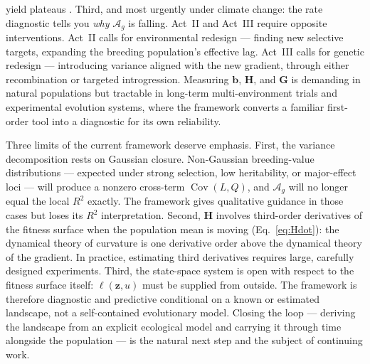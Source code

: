 \documentclass[9pt,twocolumn,twoside]{pnas-new}
\newcommand{\vect}[1]{\boldsymbol{#1}}
\newcommand{\mat}[1]{\mathbf{#1}}
\newcommand{\Ag}{\mathcal{A}_{g}}
\newcommand{\Cov}{\operatorname{Cov}}
\begin{document}
yield plateaus \cite{Technow2021}.
Third, and most urgently under climate change: the rate diagnostic
tells you \emph{why} $\Ag$ is falling.
Act~II and Act~III require opposite interventions.
Act~II calls for environmental redesign --- finding new selective
targets, expanding the breeding population's effective lag.
Act~III calls for genetic redesign --- introducing variance
aligned with the new gradient, through either recombination or
targeted introgression.
Measuring $\vect{b}$, $\mat{H}$, and $\mat{G}$ is demanding in
natural populations \cite{Kingsolver2001,KingsolverPfennig2007}
but tractable in long-term multi-environment trials and experimental
evolution systems, where the framework converts a familiar
first-order tool into a diagnostic for its own reliability.

Three limits of the current framework deserve emphasis.
First, the variance decomposition rests on Gaussian closure.
Non-Gaussian breeding-value distributions --- expected under strong
selection, low heritability, or major-effect loci --- will produce
a nonzero cross-term $\Cov(L,Q)$, and $\Ag$ will no longer equal
the local $R^2$ exactly.
The framework gives qualitative guidance in those cases but
loses its $R^2$ interpretation.
Second, $\mat{H}$ involves third-order derivatives of the fitness
surface when the population mean is moving (Eq.~\ref{eq:Hdot}):
the dynamical theory of curvature is one derivative order above
the dynamical theory of the gradient.
In practice, estimating third derivatives requires large, carefully
designed experiments.
Third, the state-space system is open with respect to the fitness
surface itself: $\ell(\vect{z},u)$ must be supplied from outside.
The framework is therefore diagnostic and predictive conditional
on a known or estimated landscape, not a self-contained
evolutionary model.
Closing the loop --- deriving the landscape from an explicit
ecological model and carrying it through time alongside the
population --- is the natural next step and the subject of
continuing work.



\showacknow{}


\bibsplit[20]

\end{document}
